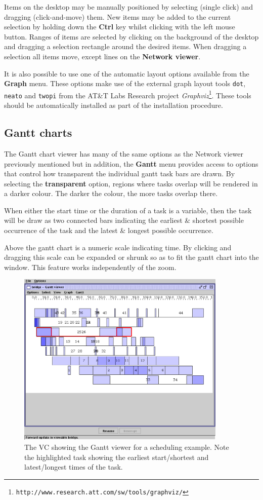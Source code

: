 Items on the desktop may be manually positioned by selecting (single
click) and dragging (click-and-move) them.  New items may be added to
the current selection by holding down the \textbf{Ctrl} key whilst
clicking with the left mouse button.  Ranges of items are selected by
clicking on the background of the desktop and dragging a selection
rectangle around the desired items.  When dragging a selection all
items move, except lines on the \textbf{Network viewer}.

It is also possible to use one of the automatic layout options
available from the \textbf{Graph} menu.  These options make use of the
external graph layout tools \texttt{dot}, \texttt{neato} and
\texttt{twopi} from the AT\&T Labs Research project
\emph{Graphviz}\footnote{\texttt{http://www.research.att.com/sw/tools/graphviz/}}.
These tools should be automatically installed as part of the
{\eclipse} installation procedure.

\subsection{Gantt charts}

The Gantt chart viewer has many of the same options as the Network
viewer previously mentioned but in addition, the \textbf{Gantt} menu
provides access to options that control how transparent the individual
gantt task bars are drawn.  By selecting the \textbf{transparent}
option, regions where tasks overlap will be rendered in a darker
colour.  The darker the colour, the more tasks overlap there.

When either the start time or the duration of a task is a variable,
then the task will be draw as two connected bars indicating the
earliest \& shortest possible occurrence of the task and the latest \&
longest possible occurrence.

Above the gantt chart is a numeric scale indicating time.  By clicking
and dragging this scale can be expanded or shrunk so as to fit the
gantt chart into the window.  This feature works independently of the
zoom.
\begin{figure}[htp]
\centering
\includegraphics[width=10cm]{vcbridgeexample}
\caption{The VC showing the Gantt viewer for a scheduling
example. Note the highlighted task showing the earliest start/shortest
and latest/longest times of the task.}
\label{fig:bridgeexample}
\end{figure}


